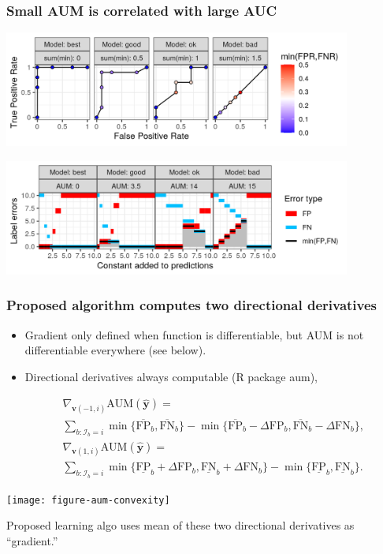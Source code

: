 \documentclass[t]{beamer}
\begin{document}
\begin{frame}
  \frametitle{Small AUM is correlated with large AUC}
  
  \includegraphics[height=1.5in]{figure-more-than-one-binary-dots}

  \includegraphics[height=1.5in]{figure-more-than-one-binary-aum}
  
\end{frame}

\begin{frame}
  \frametitle{Proposed algorithm computes two directional derivatives }

  \begin{itemize}
  \item Gradient only defined when function is differentiable, but AUM
    is not differentiable everywhere (see below).
  \item Directional derivatives always computable (R package aum),
  \end{itemize}
\begin{eqnarray*}
  &&\nabla_{\mathbf v(-1,i)} \text{AUM}(\mathbf{\hat y}) = \\
  &&\sum_{b: \mathcal I_b = i}
  \min\{
  \overline{\text{FP}}_b , 
  \overline{\text{FN}}_b 
  \}
  -
  \min\{
  \overline{\text{FP}}_b - \Delta\text{FP}_b, 
  \overline{\text{FN}}_b - \Delta\text{FN}_b
  \},\\
  &&\nabla_{\mathbf v(1,i)} \text{AUM}(\mathbf{\hat y}) = \\
  &&\sum_{b: \mathcal I_b = i}
  \min\{
  \underline{\text{FP}}_b + \Delta\text{FP}_b, 
  \underline{\text{FN}}_b + \Delta\text{FN}_b
  \}
  -
  \min\{
  \underline{\text{FP}}_b , 
  \underline{\text{FN}}_b 
     \}.
\end{eqnarray*}  

\parbox{2in}{ \texttt{[image: figure-aum-convexity]} }
\parbox{2in}{ Proposed learning algo uses mean of these two
  directional derivatives as ``gradient.''  }

\end{frame}
\end{document}
